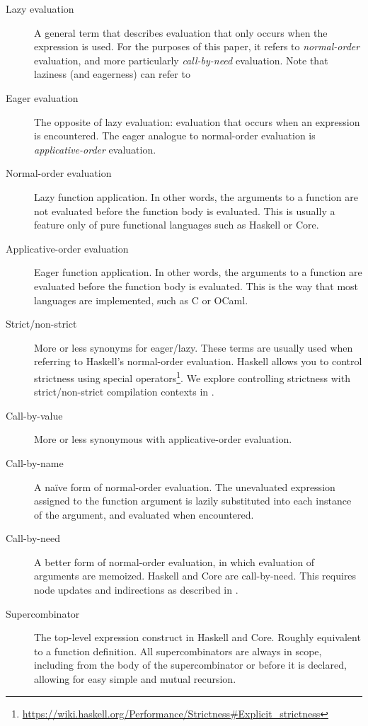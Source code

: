 \begin{description}
\item[Lazy evaluation] A general term that describes evaluation that only occurs when the expression is used. For the purposes of this paper, it refers to \textit{normal-order} evaluation, and more particularly \textit{call-by-need} evaluation. Note that laziness (and eagerness) can refer to 
\item[Eager evaluation] The opposite of lazy evaluation: evaluation that occurs when an expression is encountered. The eager analogue to normal-order evaluation is \textit{applicative-order} evaluation.
\item[Normal-order evaluation] Lazy function application. In other words, the arguments to a function are not evaluated before the function body is evaluated. This is usually a feature only of pure functional languages such as Haskell or Core.
\item[Applicative-order evaluation] Eager function application. In other words, the arguments to a function are evaluated before the function body is evaluated. This is the way that most languages are implemented, such as C or OCaml.
\item[Strict/non-strict] More or less synonyms for eager/lazy. These terms are usually used when referring to Haskell's normal-order evaluation. Haskell allows you to control strictness using special operators\footnote{\url{https://wiki.haskell.org/Performance/Strictness\#Explicit_strictness}}. We explore controlling strictness with strict/non-strict compilation contexts in .
\item[Call-by-value] More or less synonymous with applicative-order evaluation.
\item[Call-by-name] A na\"ive form of normal-order evaluation. The unevaluated expression assigned to the function argument is lazily substituted into each instance of the argument, and evaluated when encountered.
\item[Call-by-need] A better form of normal-order evaluation, in which evaluation of arguments are memoized. Haskell and Core are call-by-need. This requires node updates and indirections as described in .
\item[Supercombinator] The top-level expression construct in Haskell and Core. Roughly equivalent to a function definition. All supercombinators are always in scope, including from the body of the supercombinator or before it is declared, allowing for easy simple and mutual recursion.

\end{description}

